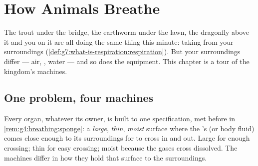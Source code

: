 \chapter{How Animals Breathe}\label{ch:g7:how-animals-breathe}

The trout under the bridge, the earthworm under the lawn,
the dragonfly above it and you on it are all doing the same
thing this minute: taking  from your surroundings
(\cref{def:g7:what-is-respiration:respiration}). But your
surroundings differ --- air, , water --- and so does the
equipment. This chapter is a tour of the  kingdom's
 machines.

\section{One problem, four machines}

\begin{proposition}\label{prop:g7:how-animals-breathe:spec}
Every  organ, whatever its owner, is built to one
specification, met before in
\cref{rem:g4:breathing:sponge}: a \emph{large}, \emph{thin},
\emph{moist} surface where the 's  (or body
fluid) comes close enough to its surroundings for  to
cross in and  out. Large for enough crossing;
thin for easy crossing; moist because the gases cross
dissolved. The machines differ in how they hold that
surface to the surroundings.
\end{proposition}
\admitted

